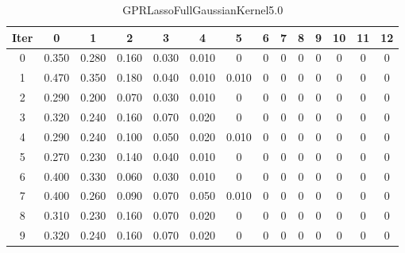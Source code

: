 \begin{table}
	\begin{center}
		\begin{tabular}{|c|c|c|c|c|c|c|c|c|c|c|c|c|c|}
			\hline
			Iter & 0 & 1 & 2 & 3 & 4 & 5 & 6 & 7 & 8 & 9 & 10 & 11 & 12 \\
			\hline
			0 & 0.350 & 0.280 & 0.160 & 0.030 & 0.010 & 0 & 0 & 0 & 0 & 0 & 0 & 0 & 0 \\
			\hline
			1 & 0.470 & 0.350 & 0.180 & 0.040 & 0.010 & 0.010 & 0 & 0 & 0 & 0 & 0 & 0 & 0 \\
			\hline
			2 & 0.290 & 0.200 & 0.070 & 0.030 & 0.010 & 0 & 0 & 0 & 0 & 0 & 0 & 0 & 0 \\
			\hline
			3 & 0.320 & 0.240 & 0.160 & 0.070 & 0.020 & 0 & 0 & 0 & 0 & 0 & 0 & 0 & 0 \\
			\hline
			4 & 0.290 & 0.240 & 0.100 & 0.050 & 0.020 & 0.010 & 0 & 0 & 0 & 0 & 0 & 0 & 0 \\
			\hline
			5 & 0.270 & 0.230 & 0.140 & 0.040 & 0.010 & 0 & 0 & 0 & 0 & 0 & 0 & 0 & 0 \\
			\hline
			6 & 0.400 & 0.330 & 0.060 & 0.030 & 0.010 & 0 & 0 & 0 & 0 & 0 & 0 & 0 & 0 \\
			\hline
			7 & 0.400 & 0.260 & 0.090 & 0.070 & 0.050 & 0.010 & 0 & 0 & 0 & 0 & 0 & 0 & 0 \\
			\hline
			8 & 0.310 & 0.230 & 0.160 & 0.070 & 0.020 & 0 & 0 & 0 & 0 & 0 & 0 & 0 & 0 \\
			\hline
			9 & 0.320 & 0.240 & 0.160 & 0.070 & 0.020 & 0 & 0 & 0 & 0 & 0 & 0 & 0 & 0 \\
			\hline
		\end{tabular}
	\end{center}
	\caption{GPRLassoFullGaussianKernel5.0}
\end{table}